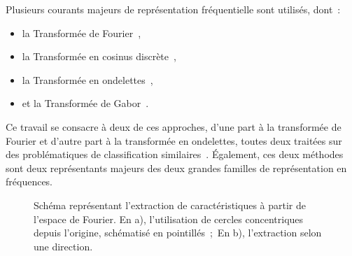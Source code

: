 Plusieurs courants majeurs de représentation fréquentielle sont utilisés, dont~:~
\begin{itemize}
    \item la Transformée de Fourier~\cite{Ursani2007, Smach2008a},
    \item la Transformée en cosinus discrète~\cite{Sorwar2001},
    \item la Transformée en ondelettes~\cite{Arivazhagan2003,Hong2010},
    \item et la Transformée de Gabor~\cite{Ursani2007}.
\end{itemize}
Ce travail se consacre à deux de ces approches, d'une part à la transformée de Fourier et d'autre part à la transformée en ondelettes, toutes deux traitées sur des problématiques de classification similaires~\cite{Wiltgen2008,Halimi2017a,Halimi2017b}. Également, ces deux méthodes sont deux représentants majeurs des deux grandes familles de représentation en fréquences.\par

\begin{figure}[h]
    \begin{center}
        \qquad
    \end{center}
    \caption{Schéma représentant l'extraction de caractéristiques à partir de l'espace de Fourier. En a), l'utilisation de cercles concentriques depuis l'origine, schématisé en pointillés~;~En b), l'extraction selon une direction.}
    \label{fig:scheme_fourier_features}
\end{figure}\par

